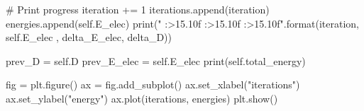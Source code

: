 \documentclass{beamer}
\begin{document}
    \begin{frame}[fragile]
        \begin{python}
            # Print progress
            iteration += 1
            iterations.append(iteration)
            energies.append(self.E_elec)
            print("{} {:>15.10f} {:>15.10f} {:>15.10f}".format(iteration, self.E_elec , delta_E_elec, delta_D))

        
            prev_D = self.D
            prev_E_elec = self.E_elec
        print(self.total_energy)
    \end{python}
\end{frame}
\begin{frame}[fragile]
    \begin{python}        
        fig = plt.figure()
        ax = fig.add_subplot()
        ax.set_xlabel("iterations")
        ax.set_ylabel("energy")
        ax.plot(iterations, energies)
        plt.show()

    \end{python}
\end{frame}
\end{document}
